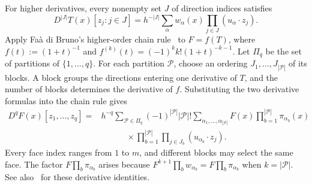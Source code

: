 \documentclass[11pt,letterpaper,twoside,leqno]{article}
\theoremstyle{bookplain}
\theoremstyle{bookremark}
\begin{document}
For higher derivatives, every nonempty set $J$ of direction indices
satisfies
\[
 D^{|J|}T(x)[z_j:j\in J]
 =h^{-|J|}\sum_\alpha w_\alpha(x)
                      \prod_{j\in J}(u_\alpha\cdot z_j).
\]
Apply Fa\`a di Bruno's higher-order chain rule~\cite{Comtet1974} to
$F=f(T)$, where $f(t):=(1+t)^{-1}$ and
$f^{(k)}(t)=(-1)^k k!(1+t)^{-k-1}$.
Let $\Pi_q$ be the set of partitions of $\{1,\ldots,q\}$.
For each partition $\mathcal P$, choose an ordering
$J_1,\ldots,J_{|\mathcal P|}$ of its blocks. A block groups the
directions entering one derivative of $T$, and the number of blocks
determines the derivative of $f$. Substituting the two derivative
formulas into the chain rule gives
\begin{equation}
 \begin{split}
 D^qF(x)[z_1,\ldots,z_q]
 ={}&h^{-q}\sum_{\mathcal P\in\Pi_q}(-1)^{|\mathcal P|}|\mathcal P|!
 \sum_{\alpha_1,\ldots,\alpha_{|\mathcal P|}}
 F(x)\prod_{b=1}^{|\mathcal P|}\pi_{\alpha_b}(x)\\
 &\hspace{3em}\times
 \prod_{b=1}^{|\mathcal P|}\prod_{j\in J_b}
 (u_{\alpha_b}\cdot z_j).
 \end{split}
 \label{appx-eq:partition-derivative}
\end{equation}
Every face index ranges from $1$ to $m$, and different blocks may
select the same face. The factor $F\prod_b\pi_{\alpha_b}$ arises
because $F^{k+1}\prod_b w_{\alpha_b}=F\prod_b\pi_{\alpha_b}$
when $k=|\mathcal P|$.
See also~\cite[Lemma~13]{GaoZhang} for these derivative identities.
\end{document}
